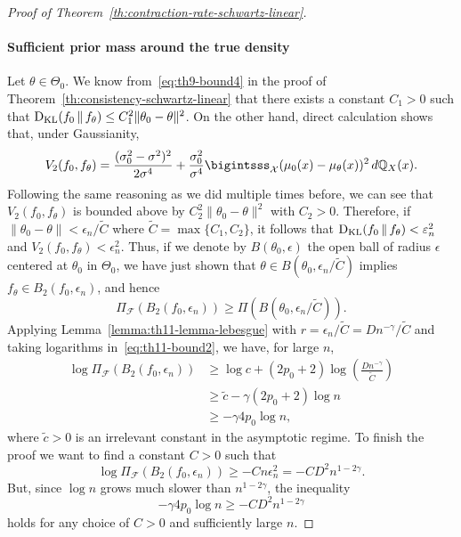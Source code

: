 \begin{proof}[Proof of Theorem~\ref{th:contraction-rate-schwartz-linear}]
\paragraph{Sufficient prior mass around the true density} Let \(\theta\in\Theta_0\). We know from~\eqref{eq:th9-bound4} in the proof of Theorem~\ref{th:consistency-schwartz-linear} that there exists a constant \(C_1>0\) such that \(\operatorname{D_{KL}}(f_0 \,\|\, f_\theta)\leq C_1^2 \|\theta_0 - \theta\|^2\). On the other hand, direct calculation \citep[see e.g.][]{choi2007posterior} shows that, under Gaussianity,
\[
  V_2(f_0, f_\theta) = \frac{(\sigma_0^2 - \sigma^2)^2}{2\sigma^4} + \frac{\sigma_0^2}{\sigma^4}\bigintsss_{\mathcal X} (\mu_0(x) - \mu_\theta(x))^2\, d\qq_X(x).
\]
Following the same reasoning as we did multiple times before, we can see that \(V_2(f_0, f_\theta)\) is bounded above by \(C_2^2\|\theta_0 - \theta\|^2\) with \(C_2>0\). Therefore, if \(\|\theta_0 - \theta\| < \epsilon_n/\tilde C\) where \(\tilde C = \max\{C_1, C_2\}\), it follows that \(\operatorname{D_{KL}}(f_0 \,\|\, f_\theta)< \varepsilon_n^2\) and \(V_2(f_0, f_\theta) < \epsilon_n^2\). Thus, if we denote by \(B(\theta_0, \epsilon)\) the open ball of radius \(\epsilon\) centered at \(\theta_0\) in \(\Theta_0\), we have just shown that \(\theta \in B(\theta_0,\epsilon_n/\tilde{C})\) implies \(f_\theta \in B_2(f_0, \epsilon_n)\), and hence
\begin{equation}\label{eq:th11-bound2}
  \Pi_{\mathcal F}(B_2(f_0, \epsilon_n)) \geq \Pi(B(\theta_0,\epsilon_n/\tilde{C})).
\end{equation}
Applying Lemma~\ref{lemma:th11-lemma-lebesgue} with \(r=\epsilon_n/\tilde C=Dn^{-\gamma}/\tilde C\) and taking logarithms in~\eqref{eq:th11-bound2}, we have, for large \(n\),
\begin{align*}
  \log \Pi_{\mathcal F}(B_2(f_0, \epsilon_n)) &\geq \log c + (2p_0+2)\log\left(\frac{Dn^{-\gamma}}{\tilde C}\right) \\
  &\geq \tilde c -\gamma(2p_0 + 2)\log n\\
  &\geq -\gamma 4p_0\log n,
\end{align*}
where \(\tilde c > 0\) is an irrelevant constant in the asymptotic regime. To finish the proof we want to find a constant \(C>0\) such that 
\[
  \log \Pi_{\mathcal F}(B_2(f_0, \epsilon_n)) \geq - Cn\epsilon_n^2=-CD^2n^{1-2\gamma}.
\]
But, since \(\log n\) grows much slower than \(n^{1-2\gamma}\), the inequality 
\[
  -\gamma 4p_0\log n \geq -CD^2n^{1-2\gamma}
\]
holds for any choice of \(C>0\) and sufficiently large \(n\).
\end{proof}

